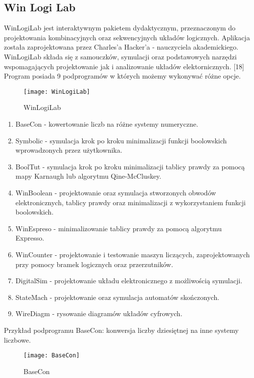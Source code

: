 \documentclass[12pt, a4paper, onside, polish]{article}				%
\begin{document}
\cleardoublepage

\subsection{Win Logi Lab}
\hspace{\parindent}
WinLogiLab jest interaktywnym pakietem dydaktycznym, przeznaczonym do projektowania kombinacyjnych oraz sekwencyjnych układów logicznych. Aplikacja została zaprojektowana przez Charles’a Hacker’a - nauczyciela akademickiego. WinLogiLab składa się z samouczków, symulacji oraz podstawowych narzędzi wspomagających projektowanie jak i analizowanie układów elektornicznych. [18] 
\newline\newline
Program posiada 9 podprogramów w których możemy wykonywać różne opcje.

\begin{figure}[H]
	{\centering \texttt{[image: WinLogiLab]} \caption{WinLogiLab}}\vspace{5mm}
\end{figure}

\begin{enumerate}
\item BaseCon - kowertowanie liczb na różne systemy numeryczne.
\item Symbolic - symulacja krok po kroku minimalizacji funkcji boolowskich wprowadzonych przez użytkownika.
\item BoolTut - symulacja krok po kroku minimalizacji tablicy prawdy za pomocą mapy Karnaugh lub algorytmu Qine-McCluskey.
\item WinBoolean - projektowanie oraz symulacja stworzonych obwodów elektronicznych, tablicy prawdy oraz minimalizacji z wykorzystaniem funkcji boolowskich.
\item WinEspreso - minimalizowanie tablicy prawdy za pomocą algorytmu Expresso.
\item WinCounter - projektowanie i testowanie maszyn liczących, zaprojektowanych przy pomocy bramek logicznych oraz przerzutników.
\item DigitalSim - projektowanie układu elektronicznego z możliwością symulacji.
\item StateMach - projektowanie oraz symulacja automatów skończonych.
\item WireDiagm - rysowanie diagramów układów cyfrowych. \newline
\end{enumerate}
Przykład podprogramu BaseCon: konwersja liczby dziesiętnej na inne systemy liczbowe.
	\begin{figure}[H]
		{\centering \texttt{[image: BaseCon]} \caption{BaseCon}}\vspace{5mm}
	\end{figure}
\end{document}
